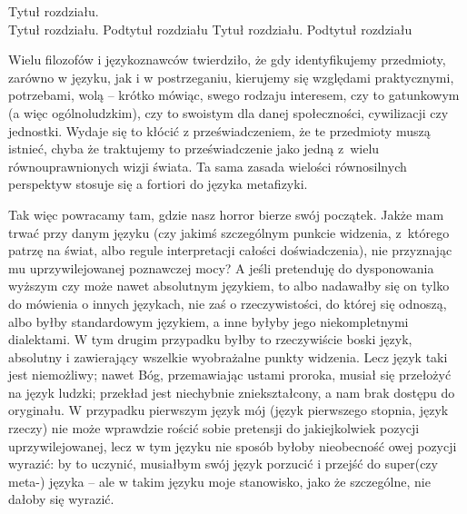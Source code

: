 {Tytuł rozdziału.\\}
{Tytuł rozdziału. Podtytuł rozdziału}
{Tytuł rozdziału. Podtytuł rozdziału}

\lettrine[loversize=0.13,lines=2,lraise=0.00,nindent=0em,findent=0.2pt]%
{W}{}ielu filozofów i językoznawców twierdziło, że gdy identyfikujemy przedmioty, zarówno w języku, jak i w postrzeganiu, kierujemy się względami praktycznymi, potrzebami, wolą -- krótko mówiąc, swego rodzaju interesem, czy to gatunkowym (a więc ogólnoludzkim), czy to swoistym dla danej społeczności, cywilizacji czy jednostki. Wydaje się to kłócić z przeświadczeniem, że te przedmioty muszą istnieć, chyba że traktujemy to przeświadczenie jako jedną z wielu równouprawnionych wizji świata. Ta sama zasada wielości równosilnych perspektyw stosuje się a fortiori do języka metafizyki.

Tak więc powracamy tam, gdzie nasz horror bierze swój początek. Jakże mam trwać przy danym języku (czy jakimś szczególnym punkcie widzenia, z którego patrzę na świat, albo regule interpretacji całości doświadczenia), nie przyznając mu uprzywilejowanej poznawczej mocy? A jeśli pretenduję do dysponowania wyższym czy może nawet absolutnym językiem, to albo nadawałby się on tylko do mówienia o innych językach, nie zaś o rzeczywistości, do której się odnoszą, albo byłby standardowym językiem, a inne byłyby jego niekompletnymi dialektami. W tym drugim przypadku byłby to rzeczywiście boski język, absolutny i zawierający wszelkie wyobrażalne punkty widzenia. Lecz język taki jest niemożliwy; nawet Bóg, przemawiając ustami proroka, musiał się przełożyć na język ludzki; przekład jest niechybnie zniekształcony, a nam brak dostępu do oryginału. W przypadku pierwszym język mój (język pierwszego stopnia, język rzeczy) nie może wprawdzie rościć sobie pretensji do jakiejkolwiek pozycji uprzywilejowanej, lecz w tym języku nie sposób byłoby nieobecność owej pozycji wyrazić: by to uczynić, musiałbym swój język porzucić i przejść do super(czy meta-) języka -- ale w takim języku moje stanowisko, jako że szczególne, nie dałoby się wyrazić.


